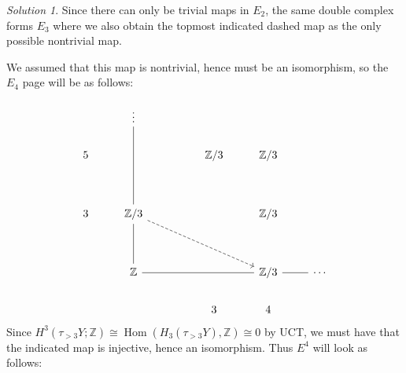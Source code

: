 \documentclass[reqno]{amsart}
\theoremstyle{definition}
\theoremstyle{remark}
\newtheorem*{solution}{Solution}
\DeclareMathOperator{\Hom}{Hom}
\begin{document}
\begin{solution}
Since there can only be trivial maps
in $E_2$, the same double complex forms
$E_3$ where we also obtain the topmost indicated dashed
map as the only possible nontrivial map.

We assumed that this map is nontrivial, hence
must be an isomorphism, so the $E_4$ page will
be as follows:

\[\begin{tikzcd}
	& \vdots \\
	5 &&& {\mathbb{Z}/3} & {\mathbb{Z}/3} \\
	\\
	3 & {\mathbb{Z}/3} &&& {\mathbb{Z}/3} \\
	\\
	& {\mathbb{Z}} &&& {\mathbb{Z}/3} & \cdots \\
	&&& 3 & 4
	\arrow[no head, from=4-2, to=1-2]
	\arrow[dashed, from=4-2, to=6-5]
	\arrow[no head, from=6-2, to=4-2]
	\arrow[no head, from=6-2, to=6-5]
	\arrow[no head, from=6-5, to=6-6]
\end{tikzcd}\]
Since $H^{3}\left( \tau_{>3}Y;\mathbb{Z} \right) 
\cong \Hom \left( H_3(\tau_{>3}Y), \mathbb{Z} \right) 
\cong 0$ by UCT, we must have that the indicated map is
injective, hence an isomorphism. Thus
$E^{4}$ will look as follows:


\end{solution}
\end{document}
